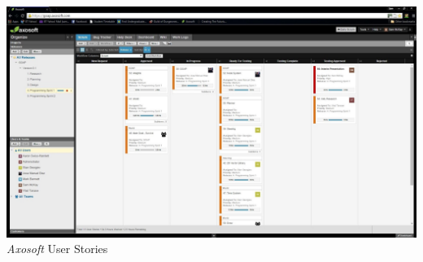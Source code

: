 \documentclass[a4paper]{report}
\begin{document}
\subsection{}
	\includegraphics[width=1.0\linewidth]{./appendixImages/AxosoftScreenShot02}
	\textit{Axosoft} User Stories
\pagebreak
\section{}
\pagebreak
\section{}
\pagebreak
\section{}
\pagebreak
\section{}
\end{document}
